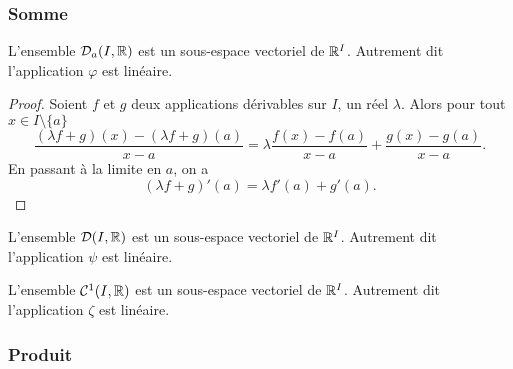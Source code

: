 \subsubsection{Somme}

\begin{theo}
  L'ensemble \(\mathcal{D}_{a}(I,\mathbb{R})\) est un sous-espace vectoriel de \(\mathbb{R}^I\). Autrement dit l'application \(\varphi\) est linéaire.
\end{theo}
\begin{proof}
  Soient \(f\) et \(g\) deux applications dérivables sur \(I\), un réel \(\lambda\). Alors pour tout \(x \in I\setminus\{a\}\)
  \begin{equation}
    \frac{(\lambda f +g)(x)-(\lambda f +g)(a)}{x-a} = \lambda \frac{f(x)-f(a)}{x-a} + \frac{g(x)-g(a)}{x-a}.
  \end{equation}
  En passant à la limite en \(a\), on a
  \begin{equation}
    (\lambda f+g)'(a)=\lambda f'(a)+g'(a).
  \end{equation}
\end{proof}
\begin{corth}
  L'ensemble \(\mathcal{D}(I,\mathbb{R})\) est un sous-espace vectoriel de \(\mathbb{R}^I\). Autrement dit l'application \(\psi\) est linéaire.
\end{corth}
\begin{corth}
  L'ensemble \(\mathcal{C}^{1}(I,\mathbb{R})\) est un sous-espace vectoriel de \(\mathbb{R}^I\). Autrement dit l'application \(\zeta\) est linéaire.
\end{corth}

\subsubsection{Produit}

